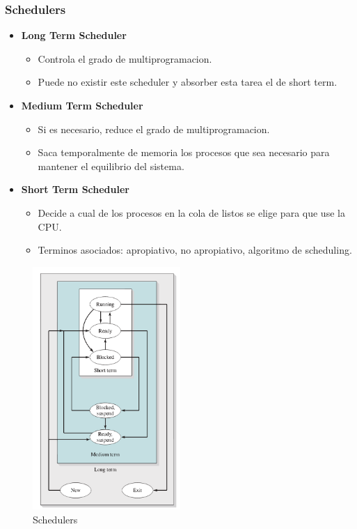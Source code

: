 \subsubsection{Schedulers}
\begin{itemize}
    \item \textbf{Long Term Scheduler}
        \begin{itemize}
            \item Controla el grado de multiprogramacion.
            \item Puede no existir este scheduler y absorber esta tarea el de short term.
        \end{itemize}
    \item \textbf{Medium Term Scheduler}
        \begin{itemize}
    \item Si es necesario, reduce el grado de multiprogramacion.
    \item Saca temporalmente de memoria los procesos que sea necesario para mantener el equilibrio del sistema.
\end{itemize}
\item \textbf{Short Term Scheduler}
\begin{itemize}
    \item Decide a cual de los procesos en la cola de listos se elige para que use la CPU.
    \item Terminos asociados: apropiativo, no apropiativo, algoritmo de scheduling.
\end{itemize}
\end{itemize}

\begin{figure}[ht]
    \begin{center}
        \includegraphics[width=0.50\textwidth]{assets/Schedulers2.pdf}
    \end{center}
    \caption{Schedulers}\label{fig:5}
\end{figure}

